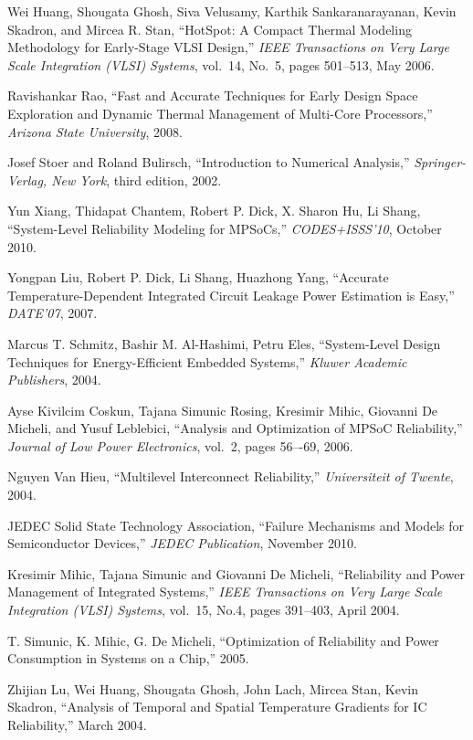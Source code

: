 \begin{thebibliography}{99}
    Wei Huang, Shougata Ghosh, Siva Velusamy, Karthik Sankaranarayanan, Kevin Skadron, and Mircea R. Stan,
    ``HotSpot: A Compact Thermal Modeling Methodology for Early-Stage VLSI Design,''
    \emph{IEEE Transactions on Very Large Scale Integration (VLSI) Systems},
    vol.~14, No.~5, pages 501--513, May 2006.

    Ravishankar Rao,
    ``Fast and Accurate Techniques for Early Design Space Exploration and Dynamic Thermal Management of Multi-Core Processors,''
    \emph{Arizona State University},
    2008.

    Josef Stoer and Roland Bulirsch,
    ``Introduction to Numerical Analysis,''
    \emph{Springer-Verlag, New York},
    third edition, 2002.

    Yun Xiang, Thidapat Chantem, Robert P. Dick, X. Sharon Hu, Li Shang,
    ``System-Level Reliability Modeling for MPSoCs,''
    \emph{CODES+ISSS'10},
    October 2010.

    Yongpan Liu, Robert P. Dick, Li Shang, Huazhong Yang,
    ``Accurate Temperature-Dependent Integrated Circuit Leakage Power Estimation is Easy,''
    \emph{DATE'07},
    2007.

    Marcus T. Schmitz, Bashir M. Al-Hashimi, Petru Eles,
    ``System-Level Design Techniques for Energy-Efficient Embedded Systems,''
    \emph{Kluwer Academic Publishers},
    2004.

    Ayse Kivilcim Coskun, Tajana Simunic Rosing, Kresimir Mihic, Giovanni De Micheli, and Yusuf Leblebici,
    ``Analysis and Optimization of MPSoC Reliability,''
    \emph{Journal of Low Power Electronics},
    vol.~2, pages 56–-69, 2006.

    Nguyen Van Hieu,
    ``Multilevel Interconnect Reliability,''
    \emph{Universiteit of Twente},
    2004.

    JEDEC Solid State Technology Association,
    ``Failure Mechanisms and Models for Semiconductor Devices,''
    \emph{JEDEC Publication},
    November 2010.

  Kresimir Mihic, Tajana Simunic and Giovanni De Micheli,
  ``Reliability and Power Management of Integrated Systems,''
  \emph{IEEE Transactions on Very Large Scale Integration (VLSI) Systems},
  vol.~15, No.4, pages 391--403, April 2004.

  T. Simunic, K. Mihic, G. De Micheli,
  ``Optimization of Reliability and Power Consumption in Systems on a Chip,''
  2005.

  Zhijian Lu, Wei Huang, Shougata Ghosh, John Lach, Mircea Stan, Kevin Skadron,
  ``Analysis of Temporal and Spatial Temperature Gradients for IC Reliability,''
  March 2004.

\end{thebibliography}
